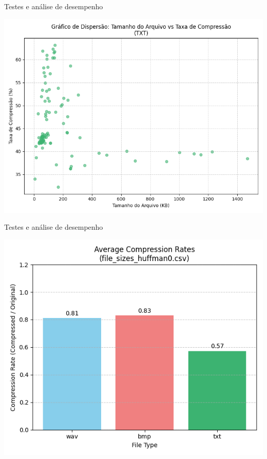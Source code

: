\documentclass{beamer}
\begin{document}
\begin{frame}{Testes e análise de desempenho}
    \begin{center}
        \includegraphics[width=0.8\linewidth]{imagens/file_sizes_lz77_txt_scatter_plot}
    \end{center}
\end{frame}


\begin{frame}{Testes e análise de desempenho}
    \begin{center}
        \includegraphics[width=0.8\linewidth]{imagens/file_sizes_huffman0_compression}
    \end{center}
\end{frame}
\end{document}
